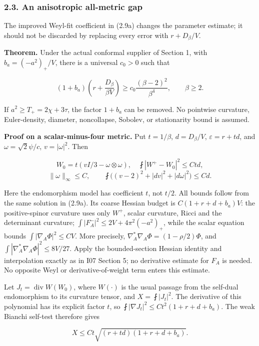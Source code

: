 \documentclass[
  11pt,
]{article}
\begin{document}
\hypertarget{an-anisotropic-all-metric-gap}{%
\subsubsection{2.3. An anisotropic all-metric
gap}\label{an-anisotropic-all-metric-gap}}

The improved Weyl-fit coefficient in (2.9a) changes the parameter
estimate; it should not be discarded by replacing every error with
\(r+D_\beta/V\).

\textbf{Theorem.} Under the actual conformal supplier of Section 1, with
\(b_a=(-a^2)_+/V\), there is a universal \(c_0>0\) such that

\[
 \boxed{(1+b_a)\left(r+\frac{D_\beta}{\beta V}\right)
       \ge c_0\frac{(\beta-2)^2}{\beta^4},\qquad \beta\ge2.}
 \tag{2.15}
\]

If \(a^2\ge T_+=2\chi+3\tau\), the factor \(1+b_a\) can be removed. No
pointwise curvature, Euler-density, diameter, noncollapse, Sobolev, or
stationarity bound is assumed.

\textbf{Proof on a scalar-minus-four metric.} Put \(t=1/\beta\),
\(d=D_\beta/V\), \(\varepsilon=r+td\), and \(\omega=\sqrt2\psi/c\),
\(v=|\omega|^2\). Then

\[
 W_0=t(vI/3-\omega\otimes\omega),\quad
 \fint|W^+-W_0|^2\le Ctd,
\] \[
 \|\omega\|_\infty\le C,\qquad
 \fint\bigl((v-2)^2+|dv|^2+|d\omega|^2\bigr)\le Cd.
 \tag{2.16}
\]

Here the endomorphism model has coefficient \(t\), not \(t/2\). All
bounds follow from the same solution in (2.9a). Its coarse Hessian
budget is \(C(1+r+d+b_a)V\): the positive-spinor curvature uses only
\(W^+\), scalar curvature, Ricci and the determinant curvature;
\(\int|F_A^-|^2\le2V+4\pi^2(-a^2)_+\), while the scalar equation bounds
\(\int|\nabla_A\Phi|^2\le CV\). More precisely,
\(\nabla_A^*\nabla_A\Phi=(1-\rho/2)\Phi\), and
\(\int|\nabla_A^*\nabla_A\Phi|^2\le8V/27\). Apply the bounded-section
Hessian identity and interpolation exactly as in I07 Section 5; no
derivative estimate for \(F_A\) is needed. No opposite Weyl or
derivative-of-weight term enters this estimate.

Let \(J_t=\operatorname{div}W(W_0)\), where \(W(\cdot)\) is the usual
passage from the self-dual endomorphism to its curvature tensor, and
\(X=\fint|J_t|^2\). The derivative of this polynomial has its explicit
factor \(t\), so \(\fint|\nabla J_t|^2\le Ct^2(1+r+d+b_a)\). The weak
Bianchi self-test therefore gives

\[
 X\le Ct\sqrt{(r+td)(1+r+d+b_a)}.
 \tag{2.17}
\]
\end{document}
